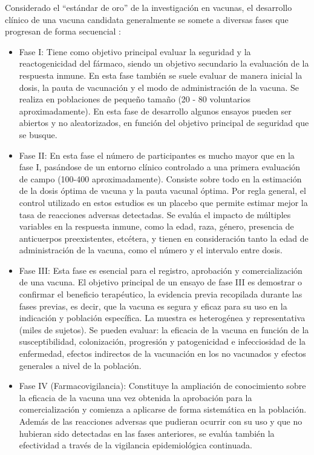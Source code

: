 Considerado el \enquote{estándar de oro} de la investigación en vacunas, el desarrollo clínico de una vacuna candidata generalmente se somete a diversas fases que progresan de forma secuencial \cite{aep2026}:

\begin{itemize}
	\item Fase I: Tiene como objetivo principal evaluar la seguridad y la reactogenicidad del fármaco, siendo un objetivo secundario la evaluación de la respuesta inmune. En esta fase también se suele evaluar de manera inicial la dosis, la pauta de vacunación y el modo de administración de la vacuna. Se realiza en poblaciones de pequeño tamaño (20 - 80 voluntarios aproximadamente). En esta fase de desarrollo algunos ensayos pueden ser abiertos y no aleatorizados, en función del objetivo principal de seguridad que se busque.
	
	\item Fase II: En esta fase el número de participantes es mucho mayor que en la fase I, pasándose de un entorno clínico controlado a una primera evaluación de campo (100-400 aproximadamente). Consiste sobre todo en la estimación de la dosis óptima de vacuna y la pauta vacunal óptima. Por regla general, el control utilizado en estos estudios es un placebo que permite estimar mejor la tasa de reacciones adversas detectadas. Se evalúa el impacto de múltiples variables en la respuesta inmune, como la edad, raza, género, presencia de anticuerpos preexistentes, etcétera, y tienen en consideración tanto la edad de administración de la vacuna, como el número y el intervalo entre dosis.
	
	\item Fase III: Esta fase es esencial para el registro, aprobación y comercialización de una vacuna. El objetivo principal de un ensayo de fase III es demostrar o confirmar el beneficio terapéutico, la evidencia previa recopilada durante las fases previas, es decir, que la vacuna es segura y eficaz para su uso en la indicación y población específica. La muestra es heterogénea y representativa (miles de sujetos). Se pueden evaluar: la eficacia de la vacuna en función de la susceptibilidad, colonización, progresión y patogenicidad e infecciosidad de la enfermedad, efectos indirectos de la vacunación en los no vacunados y efectos generales a nivel de la población.
	
	\item Fase IV (Farmacovigilancia): Constituye la ampliación de conocimiento sobre la eficacia de la vacuna una vez obtenida la aprobación para la comercialización y comienza a aplicarse de forma sistemática en la población. Además de las reacciones adversas que pudieran ocurrir con su uso y que no hubieran sido detectadas en las fases anteriores, se evalúa también la efectividad a través de la vigilancia epidemiológica continuada.
	
\end{itemize}

